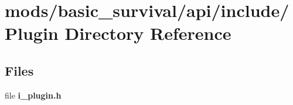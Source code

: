 \section{mods/basic\+\_\+survival/api/include/\+Plugin Directory Reference}
\label{dir_b1d5b911710f8f61ada57c41bd58cf20}
\subsection*{Files}
\begin{DoxyCompactItemize}
\item 
file {\bfseries i\+\_\+plugin.\+h}
\end{DoxyCompactItemize}
